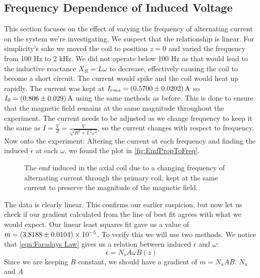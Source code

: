 \documentclass[12pt]{article}
\numberwithin{equation}{section}
\numberwithin{figure}{section}
\numberwithin{table}{section}
\begin{document}
    \subsection{Frequency Dependence of Induced Voltage}\label{sec:EmfPropToFreq}
    This section focuses on the effect of varying the frequency of alternating current on the 
    system we're investigating. We suspect that the relationship is linear.
    For simplicity's sake we moved the coil to position $z=0$ and varied the frequency from 
    100 Hz to 2 kHz. We did not operate below 100 Hz as that would lead to the inductive 
    reactance $X_R=L\omega$ to decrease, effectively causing the coil to become a short 
    circuit. The current would spike and the coil would heat up rapidly.
    The current was kept at $I_{rms}=\SI{0.57\pm0.0202}{\ampere}$ so $I_0=\SI{0.806\pm0.029}{\ampere}$ 
    using the same methods as before. This is done to ensure that the magnetic field remains at 
    the same magnitude throughout the experiment. The current needs to be adjusted as we change 
    frequency to keep it the same as $I=\frac{V}{Z}=\frac{V}{\sqrt{R^2+L^2\omega^2}}$, so the 
    current changes with respect to frequency. \newline
    Now onto the experiment: Altering the current at each frequency and finding the induced 
    $\epsilon$ at each $\omega$, we found the plot in \autoref{fig:EmfPropToFreq}. 
    \begin{figure}[H]
        \begin{center}
           \caption{The emf induced in the axial coil due to a changing frequency of alternating 
           current through the primary coil, kept at the same current to preserve the magnitude 
           of the magnetic field.}
           \label{fig:EmfPropToFreq}
        \end{center}
    \end{figure}
    The data is clearly linear. This confirms our earlier suspicion, but now let us check if 
    our gradient calculated from the line of best fit agrees with what we would expect. Our 
    linear least squares fit gave us a value of $m=\num{3.8188\pm0.0104e-05}$. To verify this 
    we will use two methods. We notice that \autoref{eqn:Faradays Law} gives us a relation 
    between induced $\epsilon$ and $\omega$:
    \begin{equation}
        \epsilon=N_aA\omega B(z)
    \end{equation}
    Since we are keeping $B$ constant, we should have a gradient of $m=N_aAB$. $N_a$ and $A$ 
\end{document}
